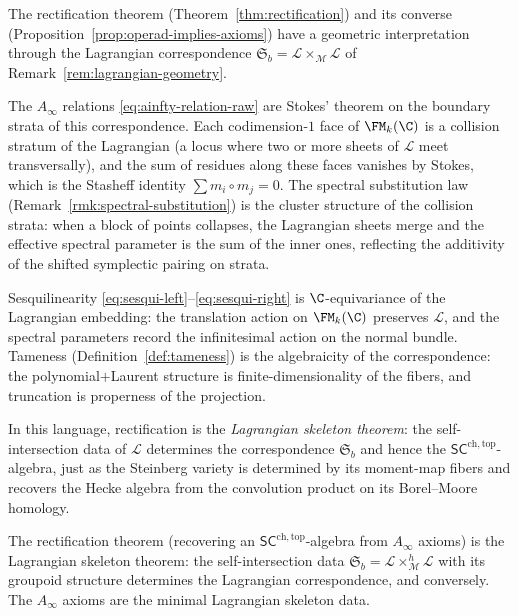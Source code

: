 \begin{remark}
\label{rem:lagrangian-skeleton}
The rectification theorem (Theorem~\ref{thm:rectification}) and
its converse (Proposition~\ref{prop:operad-implies-axioms}) have a
geometric interpretation through the Lagrangian correspondence
$\mathfrak{S}_b = \mathcal{L}\times_{\mathcal{M}}\mathcal{L}$
of Remark~\ref{rem:lagrangian-geometry}.

The $A_\infty$ relations \eqref{eq:ainfty-relation-raw} are
Stokes' theorem on the boundary strata of this correspondence.
Each codimension-$1$ face of $\FM_k(\C)$ is a collision stratum
of the Lagrangian (a locus where two or more sheets of
$\mathcal{L}$ meet transversally), and the sum of residues
along these faces vanishes by Stokes, which is the Stasheff
identity $\sum m_i\circ m_j = 0$. The spectral substitution
law (Remark~\ref{rmk:spectral-substitution}) is the cluster
structure of the collision strata: when a block of points
collapses, the Lagrangian sheets merge and the effective
spectral parameter is the sum of the inner ones, reflecting
the additivity of the shifted symplectic pairing on strata.

Sesquilinearity \eqref{eq:sesqui-left}--\eqref{eq:sesqui-right}
is $\C$-equivariance of the Lagrangian embedding: the translation
action on $\FM_k(\C)$ preserves $\mathcal{L}$, and the spectral
parameters record the infinitesimal action on the normal bundle.
Tameness (Definition~\ref{def:tameness}) is the algebraicity
of the correspondence: the polynomial$+$Laurent structure
is finite-dimensionality of the fibers, and truncation is
properness of the projection.

In this language, rectification is the \emph{Lagrangian skeleton
theorem}: the self-intersection data of $\mathcal{L}$
determines the correspondence $\mathfrak{S}_b$ and hence the
$\mathsf{SC}^{\mathrm{ch,top}}$-algebra, just as the
Steinberg variety is determined by its moment-map fibers
and recovers the Hecke algebra from the convolution product
on its Borel--Moore homology.
\end{remark}

\begin{proposition}
\label{prop:rectification-lagrangian-skeleton}
The rectification theorem \textup{(}recovering an
$\mathsf{SC}^{\mathrm{ch,top}}$-algebra from $A_\infty$ axioms\textup{)}
is the Lagrangian skeleton theorem: the self-intersection data
$\mathfrak{S}_b = \mathcal{L}\times_{\mathcal{M}}^h\mathcal{L}$
with its groupoid structure determines the Lagrangian correspondence,
and conversely. The $A_\infty$ axioms are the minimal Lagrangian
skeleton data.
\end{proposition}

